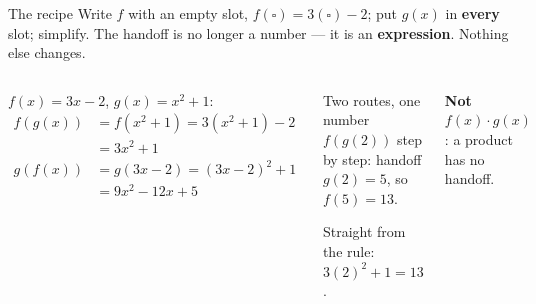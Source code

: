 \documentclass[aspectratio=169, 11pt]{beamer}
\begin{document}
\begin{frame}[t, plain]

  \begin{block}{The recipe}
    Write \(f\) with an empty slot, \(f(\square) = 3(\square) - 2\); put \(g(x)\) in
    \textbf{every} slot; simplify. The handoff is no longer a number --- it is an
    \textbf{expression}. Nothing else changes.
  \end{block}

  \medskip
  \begin{columns}[T, onlytextwidth]
      \(f(x) = 3x - 2\), \quad \(g(x) = x^2 + 1\):
      \begin{align*}
        f(g(x)) &= f(x^2+1) = 3(x^2+1) - 2 \\
                &= 3x^2 + 1 \\[4pt]
        g(f(x)) &= g(3x-2) = (3x-2)^2 + 1 \\
                &= 9x^2 - 12x + 5
      \end{align*}

      \begin{block}{Two routes, one number}
        \(f(g(2))\) step by step: handoff \(g(2) = 5\), so \(f(5) = 13\).

        \smallskip
        Straight from the rule: \(3(2)^2 + 1 = 13\).
      \end{block}

      \smallskip
      \textbf{Not} \(f(x) \cdot g(x)\): a product has no handoff.
  \end{columns}
\end{frame}
\end{document}
